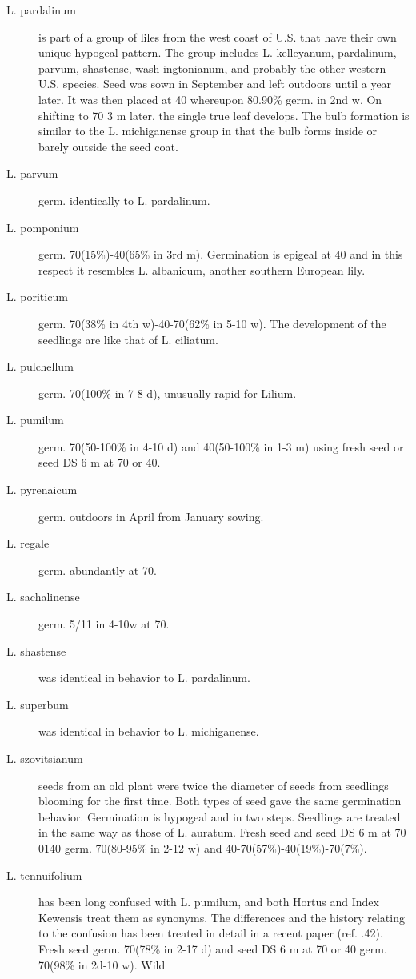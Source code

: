 \begin{description}
\item[L. pardalinum] is part of a group of liles from the west coast of U.S. that have
their own unique hypogeal pattern. The group includes L. kelleyanum, pardalinum,
parvum, shastense, wash ingtonianum, and probably the other western U.S. species.
Seed was sown in September and left outdoors until a year later. It was then placed at
40 whereupon 80.90\% germ. in 2nd w. On shifting to 70 3 m later, the single true leaf
develops. The bulb formation is similar to the L. michiganense group in that the bulb
forms inside or barely outside the seed coat.
\item[L. parvum] germ. identically to L. pardalinum.
\item[L. pomponium] germ. 70(15\%)-40(65\% in 3rd m). Germination is epigeal at 40
and in this respect it resembles L. albanicum, another southern European lily.
\item[L. poriticum] germ. 70(38\% in 4th w)-40-70(62\% in 5-10 w). The development of
the seedlings are like that of L. ciliatum.
\item[L. pulchellum] germ. 70(100\% in 7-8 d), unusually rapid for Lilium.
\item[L. pumilum] germ. 70(50-100\% in 4-10 d) and 40(50-100\% in 1-3 m) using fresh
seed or seed DS 6 m at 70 or 40.
\item[L. pyrenaicum] germ. outdoors in April from January sowing.
\item[L. regale] germ. abundantly at 70.
\item[L. sachalinense] germ. 5/11 in 4-10w at 70.
\item[L. shastense] was identical in behavior to L. pardalinum.
\item[L. superbum] was identical in behavior to L. michiganense.
\item[L. szovitsianum] seeds from an old plant were twice the diameter of seeds from
seedlings blooming for the first time. Both types of seed gave the same germination
behavior. Germination is hypogeal and in two steps. Seedlings are treated in the
same way as those of L. auratum. Fresh seed and seed DS 6 m at 70 0140 germ.
70(80-95\% in 2-12 w) and 40-70(57\%)-40(19\%)-70(7\%).
\item[L. tennuifolium] has been long confused with L. pumilum, and both Hortus and
Index Kewensis treat them as synonyms. The differences and the history relating to
the confusion has been treated in detail in a recent paper (ref. .42). Fresh seed germ.
70(78\% in 2-17 d) and seed DS 6 m at 70 or 40 germ. 70(98\% in 2d-10 w). Wild

\end{description}
